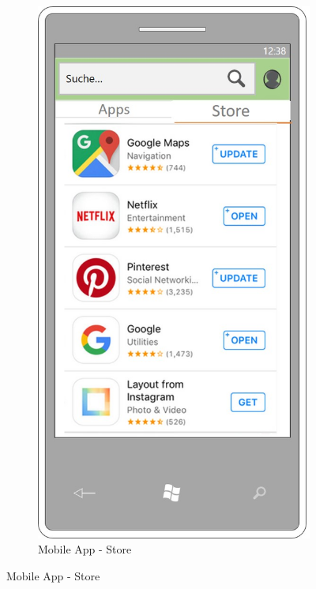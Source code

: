 \begin{figure}[!ht]
	\centering
	\begin{subfigure}{0.32\linewidth}
		\centering
		\includegraphics[width=1\linewidth]{Picture/App-Store}
		\caption{Mobile App - Store}
		\label{fig:prototyp1}
	\end{subfigure}%

\end{figure}
